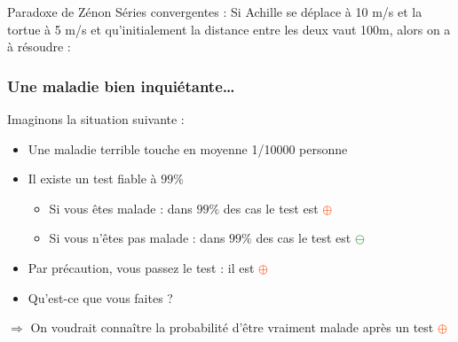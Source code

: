 \documentclass[usenames, dvipsnames, no-framenumber]{beamer}
\newcommand{\positif}{\textcolor{OrangeRed}{$\oplus$} }
\newcommand{\negatif}{\textcolor{ForestGreen}{$\ominus$} }
\begin{document}
\begin{frame}%
{Paradoxe de Zénon}
{Séries convergentes :}
Si Achille se déplace à 10 m/s et la tortue à 5 m/s et qu'initialement la distance entre les deux vaut 100m, alors on a à résoudre : 
{} %
{}
\end{frame}

\begin{frame}%
\frametitle{Une maladie bien inquiétante\dots}

Imaginons la situation suivante :

\begin{itemize}
\item Une maladie terrible touche en moyenne 1/10000 personne
\item Il existe un test fiable à $99\%$ \pause
\begin{itemize}
\item Si vous êtes malade : dans $99\%$ des cas le test est \positif
\item Si vous n'êtes pas malade : dans $99\%$ des cas le test est \negatif
\end{itemize}
\item Par précaution, vous passez le test : il est \positif \pause
\item Qu'est-ce que vous faites ? \pause
\end{itemize}

$\Rightarrow$ On voudrait connaître la probabilité d'être vraiment malade après un test \positif

\end{frame}
\end{document}
